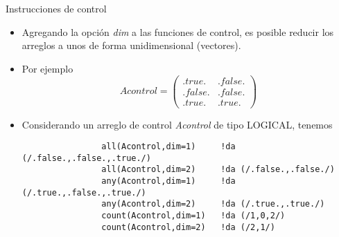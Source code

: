 \begin{frame}[fragile]{Instrucciones de control}
    \begin{itemize}[<+(0)->]
        \item Agregando la opción \emph{dim} a las funciones de control, es posible reducir los arreglos a unos de forma unidimensional (vectores).
        \item [] Por ejemplo 
            $$
                Acontrol = \left( \begin{array}{cc}
                    .true.  & .false.  \\
                    .false. & .false. \\
                    .true.  & .true. \end{array} \right)
            $$
        \item Considerando un arreglo de control \emph{Acontrol} de tipo LOGICAL, tenemos
            \begin{verbatim}
                all(Acontrol,dim=1)     !da (/.false.,.false.,.true./)
                all(Acontrol,dim=2)     !da (/.false.,.false./)
                any(Acontrol,dim=1)     !da (/.true.,.false.,.true./)
                any(Acontrol,dim=2)     !da (/.true.,.true./)
                count(Acontrol,dim=1)   !da (/1,0,2/)
                count(Acontrol,dim=2)   !da (/2,1/)
            \end{verbatim}                         
    \end{itemize}
\end{frame}


